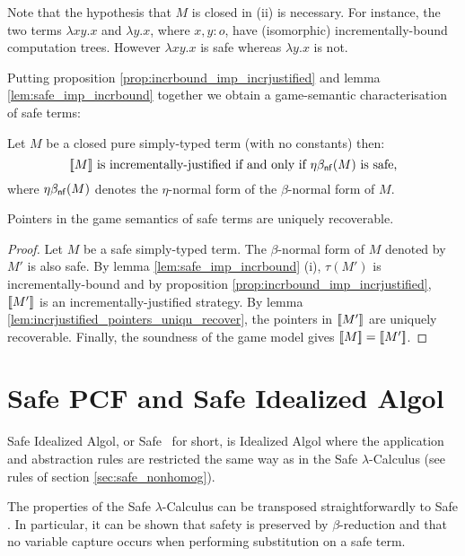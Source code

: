 Note that the hypothesis that $M$ is closed in (ii) is necessary.
For instance, the two terms $\lambda x y .x$ and $\lambda y . x$,
where $x,y:o$, have (isomorphic) incrementally-bound computation
trees. However $\lambda x y .x$ is safe whereas $\lambda y . x$ is
not.



Putting proposition \ref{prop:incrbound_imp_incrjustified} and lemma
\ref{lem:safe_imp_incrbound} together we obtain a game-semantic
characterisation of safe terms:
\begin{cor}
Let $M$ be a closed pure simply-typed term (with no constants) then:
$$ {[\![ M ]\!]} \mbox{ is incrementally-justified if and only if $\eta\beta_{\sf nf}(M)$ is safe,} $$
where $\eta\beta_{\sf nf}(M)$ denotes the $\eta$-normal form of the
$\beta$-normal form of $M$.
\end{cor}



\begin{thm}
\label{thm:safe_ptr_recoverable} Pointers in the game semantics of
safe terms are uniquely recoverable.
\end{thm}
\begin{proof}
Let $M$ be a safe simply-typed term. The $\beta$-normal form of $M$
denoted by $M'$ is also safe. By lemma \ref{lem:safe_imp_incrbound}
(i), $\tau(M')$ is incrementally-bound and by proposition
\ref{prop:incrbound_imp_incrjustified}, ${[\![ M' ]\!]}$ is an
incrementally-justified strategy. By lemma
\ref{lem:incrjustified_pointers_uniqu_recover}, the pointers in
${[\![ M' ]\!]}$ are uniquely recoverable. Finally, the soundness of the
game model gives ${[\![ M ]\!]} = {[\![ M' ]\!]}$.
\end{proof}


\section{Safe PCF and Safe Idealized Algol}

Safe Idealized Algol, or Safe \ialgol\ for short, is Idealized Algol
where the application and abstraction rules are restricted the same
way as in the Safe $\lambda$-Calculus (see rules of section
\ref{sec:safe_nonhomog}).

The properties of the Safe $\lambda$-Calculus can be transposed
straightforwardly to Safe \ialgol. In particular, it can be shown
that safety is preserved by $\beta$-reduction and that no variable
capture occurs when performing substitution on a safe term.

